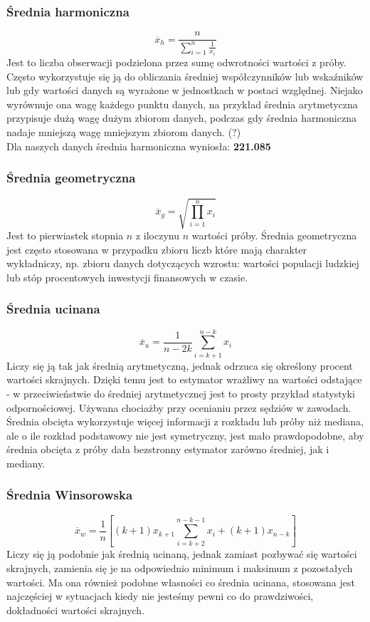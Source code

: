 \documentclass{article}
\theoremstyle{break}
\begin{document}
\subsubsection{Średnia harmoniczna}
$$\overline{x}_h=\frac{n}{\sum\limits_{i=1}^{n}\frac{1}{x_i}}$$
Jest to liczba obserwacji podzielona przez sumę odwrotności wartości z próby. Często wykorzystuje się ją do obliczania średniej współczynników lub wskaźników lub gdy wartości danych są wyrażone w jednostkach w postaci względnej. Niejako wyrównuje ona wagę każdego punktu danych, na przykład średnia arytmetyczna przypisuje dużą wagę dużym zbiorom danych, podczas gdy średnia harmoniczna nadaje mniejszą wagę mniejszym zbiorom danych. (?) \\
Dla naszych danych średnia harmoniczna wyniosła: \textbf{221.085}
\subsubsection{Średnia geometryczna}
$$\overline{x}_g=\sqrt{\prod\limits_{i=1}^{n}x_i}$$
Jest to pierwiastek stopnia $n$ z iloczynu $n$ wartości próby. Średnia geometryczna jest często stosowana w przypadku zbioru liczb które mają charakter wykładniczy, np. zbioru danych dotyczących wzrostu: wartości populacji ludzkiej lub stóp procentowych inwestycji finansowych w czasie.
\subsubsection{Średnia ucinana}
$$\overline{x}_u=\frac{1}{n-2k}\sum\limits_{i=k+1}^{n-k}x_i$$
Liczy się ją tak jak średnią arytmetyczną, jednak odrzuca się określony procent wartości skrajnych. Dzięki temu jest to estymator wrażliwy na wartości odstające - w przeciwieństwie do średniej arytmetycznej jest to prosty przykład statystyki odpornościowej. Używana chociażby przy ocenianiu przez sędziów w zawodach. Średnia obcięta wykorzystuje więcej informacji z rozkładu lub próby niż mediana, ale o ile rozkład podstawowy nie jest symetryczny, jest mało prawdopodobne, aby średnia obcięta z próby dała bezstronny estymator zarówno średniej, jak i mediany.
\subsubsection{Średnia Winsorowska}
$$\overline{x}_w=\frac{1}{n}[(k+1)x_{k+1}\sum\limits_{i=k+2}^{n-k-1}x_i +(k+1)x_{n-k}]$$
Liczy się ją podobnie jak średnią ucinaną, jednak zamiast pozbywać się wartości skrajnych, zamienia się je na odpowiednio minimum i maksimum z pozostałych wartości. Ma ona również podobne własności co średnia ucinana, stosowana jest najczęściej w sytuacjach kiedy nie jesteśmy pewni co do prawdziwości, dokładności wartości skrajnych.
\end{document}
